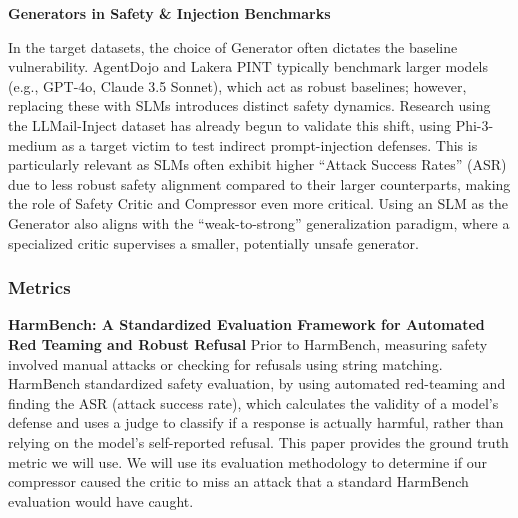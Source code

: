 \documentclass[11pt]{article}
\begin{document}
\noindent \textbf{Generators in Safety \& Injection Benchmarks} 

In the target datasets, the choice of Generator often dictates the baseline vulnerability. AgentDojo and Lakera PINT typically benchmark larger models (e.g., GPT-4o, Claude 3.5 Sonnet), which act as robust baselines; however, replacing these with SLMs introduces distinct safety dynamics. Research using the LLMail-Inject dataset has already begun to validate this shift, using Phi-3-medium as a target victim to test indirect prompt-injection defenses. This is particularly relevant as SLMs often exhibit higher “Attack Success Rates” (ASR) due to less robust safety alignment compared to their larger counterparts, making the role of Safety Critic and Compressor even more critical. Using an SLM as the Generator also aligns with the “weak-to-strong” generalization paradigm, where a specialized critic supervises a smaller, potentially unsafe generator. \newline






\subsubsection{Metrics}
\textbf{HarmBench: A Standardized Evaluation Framework for Automated Red Teaming and Robust Refusal}
Prior to HarmBench, measuring safety involved manual attacks or checking for refusals using string matching. HarmBench standardized safety evaluation, by using automated red-teaming and finding the ASR (attack success rate), which calculates the validity of a model's defense and uses a judge to classify if a response is actually harmful, rather than relying on the model's self-reported refusal. This paper provides the ground truth metric we will use. We will use its evaluation methodology to determine if our compressor caused the critic to miss an attack that a standard HarmBench evaluation would have caught. \newline
\end{document}
